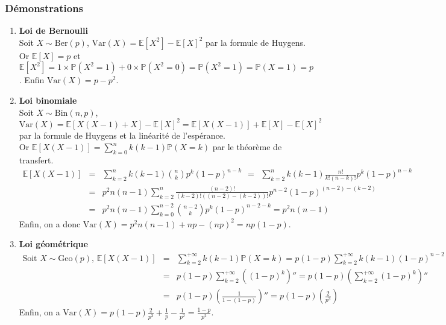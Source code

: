 \documentclass[a4paper,10pt]{book} %
\newcommand{\E}{\mathbb{E}} %
\renewcommand{\P}{\mathbb{P}} %
\newcommand{\Ber}{\mathrm{Ber}} %
\newcommand{\Bin}{\mathrm{Bin}} %
\newcommand{\Geo}{\mathrm{Geo}} %
\newcommand{\Var}{\mathrm{Var}} %
\begin{document}
\subsubsection{Démonstrations}
\begin{enumerate}
\item \textbf{Loi de Bernoulli}\\
Soit $X\sim \Ber(p)$, $\Var(X) =\E[X^2]-\E[X]^2$ par la formule de Huygens.\\Or $\E[X] = p$ et $\E[X^2] =1\times \P(X^2=1) + 0\times \P(X^2 = 0)=\P(X^2=1)=\P(X=1)=p$. Enfin $\Var(X)=p-p^2$.\\

\item \textbf{Loi binomiale}\\
Soit $X \sim \Bin(n,p)$, $\Var(X)=\E[X(X-1)+X]-\E[X]^2=\E[X(X-1)]+\E[X]-\E[X]^2$ par la formule de Huygens et la linéarité de l'espérance.\\

Or $\displaystyle \E[X(X-1)]=\sum_{k=0}^nk(k-1)\P(X=k)$ par le théorème de transfert.\\
$\begin{array}{rcl}\displaystyle \E[X(X-1)]&=& \displaystyle \sum_{k=2}^nk(k-1)\binom{n}{k}p^k(1-p)^{n-k} ~~=~~ \sum_{k=2}^nk(k-1)\frac{n!}{k!(n-k)!}p^k(1-p)^{n-k}\\
&=&\displaystyle  p^2n(n-1) \sum_{k=2}^n\frac{(n-2)!}{(k-2)! ((n-2)-(k-2))!}p^{n-2}(1-p)^{(n-2)-(k-2)}\\
&=&\displaystyle  p^2n(n-1)\sum_{k=0}^{n-2}\binom{n-2}{k}p^k(1-p)^{n-2-k}=p^2n(n-1)\end{array}$\\

Enfin, on a donc $\Var(X)=p^2n(n-1)+np-(np)^2=np(1-p)$.\\

\item \textbf{Loi géométrique}\\
$\begin{array}{rcl}\text{Soit }X\sim \Geo(p)\text{, }\E[X(X-1)]&=&\displaystyle \sum_{k=2}^{+\infty}k(k-1)\P(X=k)=p(1-p)\sum_{k=2}^{+\infty}k(k-1)(1-p)^{n-2} \\
&=& \displaystyle p(1-p)\sum_{k=2}^{+\infty}((1-p)^k)''=p(1-p)(\sum_{k=2}^{+\infty}(1-p)^k)''\\
&=&\displaystyle p(1-p)(\frac{1}{1-(1-p)})'' = p(1-p)(\frac{2}{p^3})\end{array}$\\

Enfin, on a $\Var(X)=p(1-p)\frac{2}{p^3}+\frac{1}{p}-\frac{1}{p^2}=\frac{1-p}{p^2}$.\\


\end{enumerate}
\end{document}
